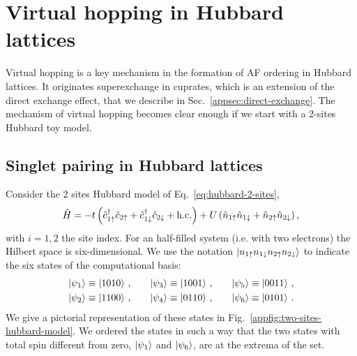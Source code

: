 \def\GraphicsFolder{appendices/superexchange-virtual-hopping/pictures}

\chapter{Virtual hopping in Hubbard lattices}\label{app:superexchange-virtual-hopping}
 
Virtual hopping is a key mechanism in the formation of AF ordering in Hubbard lattices. It originates superexchange in cuprates, which is an extension of the direct exchange effect, that we describe in Sec.~\ref{appsec:direct-exchange}. The mechanism of virtual hopping becomes clear enough if we start with a $2$-sites Hubbard toy model.

\section{Singlet pairing in Hubbard lattices}\label{appsec:hubbard-2}

Consider the $2$ sites Hubbard model of Eq.~\eqref{eq:hubbard-2-sites},
\[
	\hat H = 
	-t \left(
		 \hat c_{1\uparrow}^\dagger \hat c_{2\uparrow} + \hat c_{1\downarrow}^\dagger \hat c_{2\downarrow} + \mathrm{h.c.} 
	\right)
	+ U \left(
		 \hat n_{1\uparrow} \hat n_{1\downarrow} + \hat n_{2\uparrow} \hat n_{2\downarrow} 
	\right),
\]
with $i=1,2$ the site index. For an half-filled system (i.e. with two electrons) the Hilbert space is six-dimensional. We use the notation $\ket{n_{1\uparrow} n_{1\downarrow} n_{2\uparrow} n_{2\downarrow}}$ to indicate the six states of the computational basis:
\begin{equation}\label{appeq:hubbard-2-states}
	\begin{aligned}
		\ket{\psi_1} &\equiv \ket{1010} \, , \\
		\ket{\psi_2} &\equiv \ket{1100} \, , \\
	\end{aligned}
	\qquad
	\begin{aligned}
		\ket{\psi_3} &\equiv \ket{1001} \, , \\
		\ket{\psi_4} &\equiv \ket{0110} \, , \\
	\end{aligned}
	\qquad
	\begin{aligned}
		\ket{\psi_5} &\equiv \ket{0011} \, , \\
		\ket{\psi_6} &\equiv \ket{0101} \, . \\
	\end{aligned}
\end{equation}
We give a pictorial representation of these states in Fig.~\ref{appfig:two-sites-hubbard-model}. We ordered the states in such a way that the two states with total spin different from zero, $\ket{\psi_1}$ and $\ket{\psi_6}$, are at the extrema of the set.

